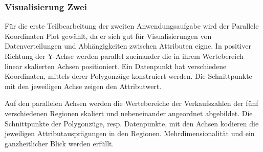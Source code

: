 \documentclass[usegeometry=true]{scrartcl}
\begin{document}

\subsubsection{Visualisierung Zwei}
Für die erste Teilbearbeitung der zweiten Anwendungsaufgabe wird der Parallele Koordinaten Plot gewählt, da er sich gut für Visualisierungen von Datenverteilungen und Abhängigkeiten zwischen Attributen eigne.\cite[11]{Chan.2006}
In positiver Richtung der Y-Achse werden parallel zueinander die in ihrem Wertebereich linear skalierten Achsen positioniert.
Ein Datenpunkt hat verschiedene Koordinaten, mittels derer Polygonzüge konstruiert werden.
Die Schnittpunkte mit den jeweiligen Achse zeigen den Attributwert.\cite[25f.]{Inselberg.1987} \cite[11]{Chan.2006}

Auf den parallelen Achsen werden die Wertebereiche der Verkaufszahlen der fünf verschiedenen Regionen skaliert und nebeneinander angeordnet abgebildet.
Die Schnittpunkte der Polygonzüge, resp. Datenpunkte, mit den Achsen kodieren die jeweiligen Attributausprägungen in den Regionen.
Mehrdimensionalität und ein ganzheitlicher Blick werden erfüllt.
\end{document}
